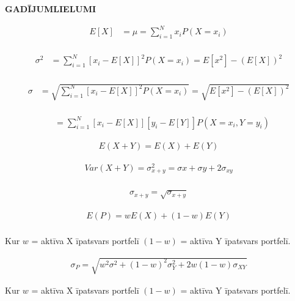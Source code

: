 
\vspace*{.5in}
\textbf{GADĪJUMLIELUMI}

{\begin{align*}
    E[X] &= \mu = \sum_{i=1}^{N}x_iP(X=x_i) \\
\end{align*}}

{\begin{align*}
    \sigma^2 &= \sum_{i=1}^{N}[x_i-E[X]]^2P(X=x_i) = E[x^2] - (E[X])^2 \\
\end{align*}}

{\begin{align*}
    \sigma &= \sqrt{\sum_{i=1}^{N}[x_i-E[X]]^2P(X=x_i)} = \sqrt{E[x^2] - (E[X])^2} \\
\end{align*}}

{\begin{align*}
     &= \sum_{i=1}^{N}[x_i-E[X]][y_i-E[Y]]P(X=x_i, Y=y_i)
\end{align*}}

{\begin{align*}
    E(X+Y) = E(X) + E(Y)
\end{align*}}

{\begin{align*}
    Var(X+Y) = \sigma_{x+y}^2 = \sigma{x} + \sigma{y} + 2\sigma_{xy}\\
\end{align*}}

{\begin{align*}
    \sigma_{x+y} = \sqrt{\sigma_{x+y}} 
\end{align*}}


{\begin{align*}
    E(P)=wE(X)+(1-w)E(Y)\\
\end{align*}

Kur $w$ = aktīva X īpatsvars portfelī $(1 - w)$ = aktīva Y īpatsvars portfelī.
}

{\begin{align*}
    \sigma_P=\sqrt{w^2\sigma^2+(1-w)^2\sigma_Y^2+2w(1-w)\sigma_{XY}}
\end{align*}

Kur $w$ = aktīva X īpatsvars portfelī $(1 - w)$ = aktīva Y īpatsvars portfelī.
}

